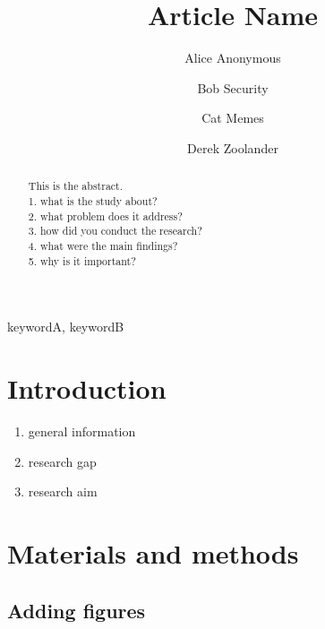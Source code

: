 \documentclass[]{elsarticle} %
\providecommand{\tightlist}{%
  \setlength{\itemsep}{0pt}\setlength{\parskip}{0pt}}
\begin{document}
\begin{frontmatter}

  \title{Article Name}
    \author[Some Institute of Technology]{Alice Anonymous}
    \author[Another University]{Bob Security}
    \author[Another University]{Cat Memes}
    \author[Some Institute of Technology]{Derek Zoolander}
      \address[Some Institute of Technology]{Department, Street, City, State, Zip}
    \address[Another University]{Department, Street, City, State, Zip}
  
  \begin{abstract}
  This is the abstract.\\
  1. what is the study about?\\
  2. what problem does it address?\\
  3. how did you conduct the research?\\
  4. what were the main findings?\\
  5. why is it important?
  \end{abstract}
   \begin{keyword} keywordA, keywordB\end{keyword}
 \end{frontmatter}

\section{Introduction}\label{intro}

\begin{enumerate}
\def\labelenumi{\arabic{enumi}.}
\tightlist
\item
  general information
\item
  research gap
\item
  research aim
\end{enumerate}

\section{Materials and methods}\label{method}

\subsection{Adding figures}\label{figure}
\end{document}
